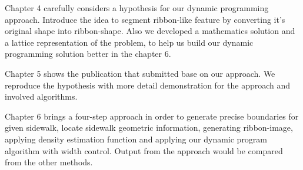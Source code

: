 Chapter 4 carefully considers a hypothesis for our dynamic programming approach. Introduce the idea to segment ribbon-like feature by converting it's original shape into ribbon-shape. Also we developed a mathematics solution and a lattice representation of the problem, to help us build our dynamic programming solution better in the chapter 6.

Chapter 5 shows the publication that submitted base on our approach. We reproduce the hypothesis with more detail demonstration for the approach and involved algorithms. 

Chapter 6 brings a four-step approach in order to generate precise boundaries for given sidewalk, locate sidewalk geometric information, generating ribbon-image, applying density estimation function and applying our dynamic program algorithm with width control. Output from the approach would be compared from the other methods.

